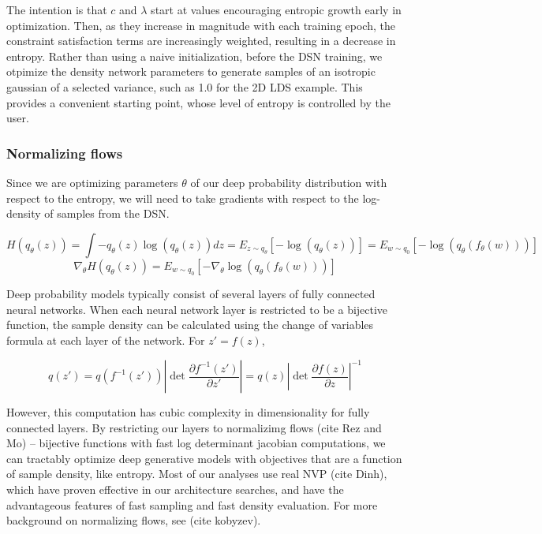 \documentclass[11pt]{article}
\begin{document}
The intention is that $c$ and $\lambda$ start at values encouraging entropic growth early in optimization.  Then, as they increase in magnitude with each training epoch, the constraint satisfaction terms are increasingly weighted, resulting in a decrease in entropy.  Rather than using a naive initialization, before the DSN training, we otpimize the density network parameters to generate samples of an isotropic gaussian of a selected variance, such as 1.0 for the 2D LDS example.  This provides a convenient starting point, whose level of entropy is controlled by the user.

\subsubsection{Normalizing flows}
Since we are optimizing parameters  $\theta$ of our deep probability distribution with respect to the entropy, we will need to take gradients with respect to the log-density of samples from the DSN.

\begin{equation}
H(q_\theta(z)) = \int - q_\theta(z) \log(q_\theta(z)) dz = E_{z \sim q_\theta}\left[-\log(q_\theta(z)) \right] = E_{w \sim q_0}\left[-\log(q_\theta(f_\theta(w))) \right]
\end{equation}
\begin{equation}
\nabla_\theta H(q_\theta(z)) = E_{w \sim q_0}\left[- \nabla_\theta \log(q_\theta(f_\theta(w))) \right]
\end{equation}

Deep probability models typically consist of several layers of fully connected neural networks.  When each neural network layer is restricted to be a bijective function, the sample density can be calculated using the change of variables formula at each layer of the network.  For $z' = f(z)$,

\begin{equation}
q(z') = q(f^{-1}(z')) \left| \det \frac{\partial f^{-1}(z')}{\partial z'} \right| = q(z) \left| \det \frac{\partial f(z)}{\partial z} \right|^{-1}
\end{equation}

However, this computation has cubic complexity in dimensionality for fully connected layers.  By restricting our layers to normalizimg flows (cite Rez and Mo) -- bijective functions with fast log determinant jacobian computations, we can tractably optimize deep generative models with objectives that are a function of sample density, like entropy. Most of our analyses use real NVP (cite Dinh), which have proven effective in our architecture searches, and have the advantageous features of fast sampling and fast density evaluation.  For more background on normalizing flows, see (cite kobyzev).
\end{document}
